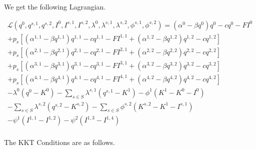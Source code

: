 \documentclass[11pt,a4paper]{article}
\begin{document}
We get the following Lagrangian.

\begin{eqnarray*}
	\mathcal{L}(q^0,q^{s,1},q^{s,2},I^0,I^{s,1},I^{s,2},\lambda^0,\lambda^{s,1},\lambda^{s,2},\phi^{s,1},\phi^{s,2})= (\alpha^0-\beta q^0)q^0 - cq^0 - FI^0 \\
        + p_s\left[(\alpha^{1,1}-\beta q^{1,1})q^{1,1} - cq^{1,1} - FI^{1,1} + (\alpha^{1,2}-\beta q^{1,2})q^{1,2} - cq^{1,2}\right] \\
        + p_s\left[(\alpha^{2,1}-\beta q^{2,1})q^{2,1} - cq^{2,1} - FI^{2,1} + (\alpha^{2,2}-\beta q^{2,2})q^{2,2} - cq^{2,2}\right] \\
        + p_s\left[(\alpha^{3,1}-\beta q^{3,1})q^{3,1} - cq^{3,1} - FI^{3,1} + (\alpha^{3,2}-\beta q^{3,2})q^{3,2} - cq^{3,2}\right] \\
        + p_s\left[(\alpha^{4,1}-\beta q^{4,1})q^{4,1} - cq^{4,1} - FI^{4,1} + (\alpha^{4,2}-\beta q^{4,2})q^{4,2} - cq^{4,2}\right] \\
         - \lambda^0(q^0-K^0) - \sum_{s\in S}\lambda^{s,1}(q^{s,1}-K^{1}) - \phi^{1}(K^{1}-K^0-I^0) \\
- \sum_{s\in S}\lambda^{s,2}(q^{s,2}-K^{s,2}) - \sum_{s\in S}\phi^{s,2}(K^{s,2}-K^1-I^{s,1})\\
- \psi^{1}(I^{1,1} - I^{1,2}) - \psi^{2}(I^{1,3} - I^{1,4})\\
\end{eqnarray*}

The KKT Conditions are as follows.
\end{document}
